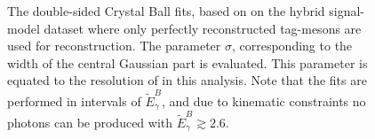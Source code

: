 \begin{figure}[htbp!]
{    }

    \caption{\label{fig:issignal_resolution_fits} The double-sided Crystal Ball fits, based on  
    on the hybrid signal-model dataset where only perfectly reconstructed tag-\B mesons are used for \EB reconstruction.
    The parameter $\sigma$, corresponding to the width of the central Gaussian part is evaluated.
    This parameter is equated to the resolution of \EB in this analysis.
    Note that the fits are performed in intervals of $\tilde{E}_{\gamma}^B$, and due to kinematic constraints
    no \BtoXsgamma photons can be produced with $\tilde{E}_{\gamma}^B\gtrsim 2.6$.
    }
\end{figure}

